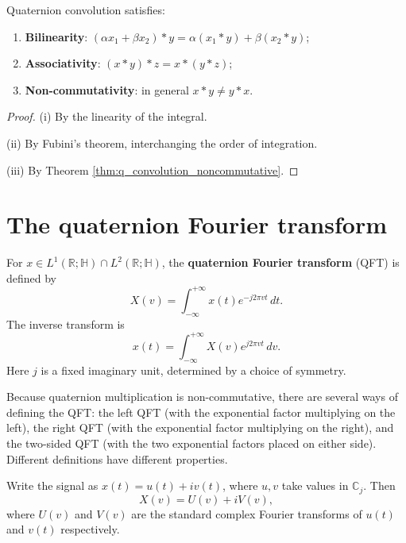 \begin{proposition}\label{prop:q_convolution_properties}
Quaternion convolution satisfies:
\begin{enumerate}[label=(\roman*)]
    \item \textbf{Bilinearity}: $(\alpha x_1+\beta x_2)*y=\alpha(x_1*y)+\beta(x_2*y)$;
    \item \textbf{Associativity}: $(x*y)*z=x*(y*z)$;
    \item \textbf{Non-commutativity}: in general $x*y\neq y*x$.
\end{enumerate}
\end{proposition}

\begin{proof}
(i) By the linearity of the integral.

(ii) By Fubini's theorem, interchanging the order of integration.

(iii) By Theorem \ref{thm:q_convolution_noncommutative}.
\end{proof}

\section{The quaternion Fourier transform}

\begin{definition}\label{def:q_fourier}
For $x\in L^1(\mathbb{R};\mathbb{H})\cap L^2(\mathbb{R};\mathbb{H})$, the \textbf{quaternion Fourier transform} (QFT) is defined by
\[
X(v)=\int_{-\infty}^{+\infty}x(t)e^{-j2\pi vt}\,dt.
\]
The inverse transform is
\[
x(t)=\int_{-\infty}^{+\infty}X(v)e^{j2\pi vt}\,dv.
\]
Here $j$ is a fixed imaginary unit, determined by a choice of symmetry.
\end{definition}

\begin{remark}\label{rem:q_fourier_types}
Because quaternion multiplication is non-commutative, there are several ways of defining the QFT: the left QFT (with the exponential factor multiplying on the left), the right QFT (with the exponential factor multiplying on the right), and the two-sided QFT (with the two exponential factors placed on either side). Different definitions have different properties.
\end{remark}

\begin{proposition}\label{prop:q_fourier_complex_relation}
Write the signal as $x(t)=u(t)+iv(t)$, where $u,v$ take values in $\mathbb{C}_j$. Then
\[
X(v)=U(v)+iV(v),
\]
where $U(v)$ and $V(v)$ are the standard complex Fourier transforms of $u(t)$ and $v(t)$ respectively.
\end{proposition}

